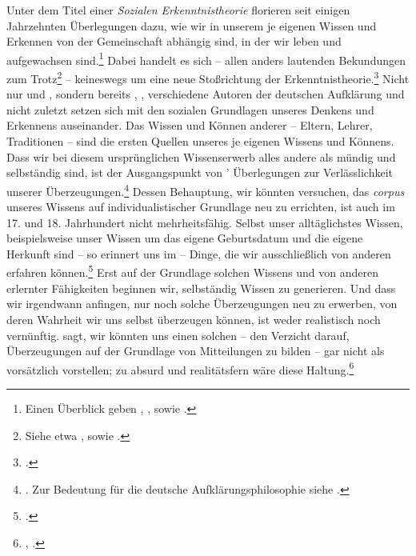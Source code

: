 
Unter dem Titel einer \emph{Sozialen Erkenntnistheorie} florieren seit einigen
Jahrzehnten Überlegungen dazu, wie wir in unserem je eigenen Wissen und Erkennen
von der Gemeinschaft abhängig sind, in der wir leben und aufgewachsen
sind.\footnote{Einen Überblick geben \cite{Schmitt:Introduction2010},
\cite{Wilholt:SozialeErkenntnistheorie2007}, sowie
\cite{Scholz:DasZeugnisanderer2001}.} Dabei handelt es sich -- allen
anders lautenden Bekundungen zum Trotz\footnote{Siehe etwa
\cite[][529--531]{Grundmann:AnalytischeEinfuehrungindieErkenntnistheorie2008},
sowie \cite[][46]{Wilholt:SozialeErkenntnistheorie2007}.} -- keineswegs um eine
neue Stoßrichtung der Erkenntnistheorie.\footnote{\cite[Vgl.][46]{Scholz:DasZeugnisanderer2001}.}
Nicht nur  und
, sondern bereits
,
, verschiedene
Autoren der deutschen Aufklärung und nicht zuletzt  setzen
sich mit den sozialen Grundlagen unseres Denkens und Erkennens
auseinander. Das Wissen und Können anderer -- Eltern, Lehrer, Traditionen -- sind
die ersten Quellen unseres je eigenen Wissens und Könnens. Dass wir bei diesem
ursprünglichen Wissenserwerb alles andere als mündig und selbständig sind, ist
der Ausgangspunkt von '
Überlegungen zur Verlässlichkeit unserer
Überzeugungen.\footnote{\cite[Vgl.][VI:
13.1--12]{Descartes:OeuvresdeDescartes1983}.
Zur Bedeutung für die deutsche Aufklärungsphilosophie siehe
\cite[][104]{Schneiders:AufklaerungundVorurteilskritik1983}.} Dessen Behauptung,
wir könnten versuchen, das \emph{corpus} unseres Wissens auf
individualistischer Grundlage neu zu errichten, ist  auch im 17. und 18.
Jahrhundert nicht mehrheitsfähig. Selbst unser alltäglichstes Wissen,
beispielsweise unser Wissen um das eigene Geburtsdatum und die eigene Herkunft
sind -- so erinnert uns  im  -- Dinge, die wir ausschließlich von anderen erfahren
können.\footnote{\cite[Vgl.][II: 10.22--24]{Spinoza:SpinozaOpera1972}.} Erst
auf der Grundlage solchen Wissens und von anderen erlernter Fähigkeiten beginnen
wir, selbständig  Wissen zu generieren. Und dass wir irgendwann anfingen, nur
noch solche Überzeugungen neu zu erwerben, von deren Wahrheit wir uns selbst
überzeugen können, ist weder realistisch noch vernünftig.
 sagt, wir könnten uns einen solchen
 -- den Verzicht darauf, Überzeugungen
auf der Grundlage von Mitteilungen zu bilden -- gar nicht als vorsätzlich
vorstellen; zu absurd und realitätsfern wäre diese
Haltung.\footnote{\cite[Vgl.][A
328]{Kant:Washeisst:SichimDenkenorientieren?1977}, \cite[][VIII:
146.8--11]{Kant:GesammelteWerke1900ff.}.}

